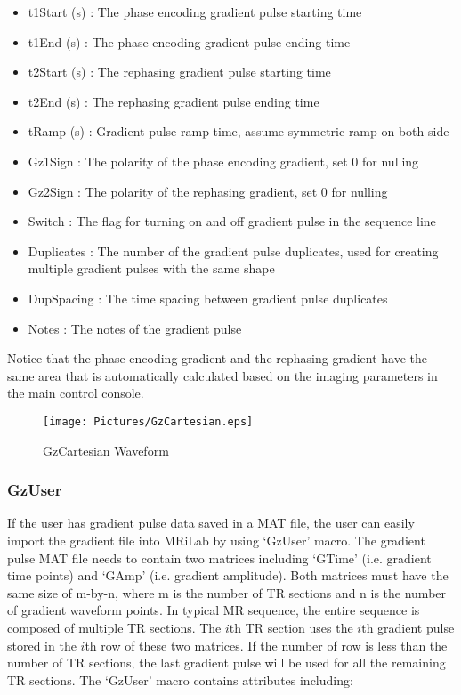 \documentclass{book}%
\begin{document}
\begin{itemize}
	\item t1Start (s) : The phase encoding gradient pulse starting time
	\item t1End (s) : The phase encoding gradient pulse ending time
	\item t2Start (s) : The rephasing gradient pulse starting time
	\item t2End (s) : The rephasing gradient pulse ending time
	\item tRamp (s) : Gradient pulse ramp time, assume symmetric ramp on both side
	\item Gz1Sign : The polarity of the phase encoding gradient, set 0 for nulling
	\item Gz2Sign : The polarity of the rephasing gradient, set 0 for nulling
	\item Switch : The flag for turning on and off gradient pulse in the sequence line
	\item Duplicates : The number of the gradient pulse duplicates, used for creating multiple gradient pulses with the same shape
	\item DupSpacing : The time spacing between gradient pulse duplicates
	\item Notes : The notes of the gradient pulse 
\end{itemize}

Notice that the phase encoding gradient and the rephasing gradient have the same area that is automatically calculated based on the imaging parameters in the main control console.

\begin{figure}[htbp]
	\centering
		\texttt{[image: Pictures/GzCartesian.eps]}
	\caption{GzCartesian Waveform}
	\label{fig:GzCartesian}
\end{figure}

\subsubsection{GzUser}

If the user has gradient pulse data saved in a MAT file, the user can easily import the gradient file into MRiLab by using `GzUser' macro. The gradient pulse MAT file needs to contain two matrices including `GTime' (i.e. gradient time points) and `GAmp' (i.e. gradient amplitude). Both matrices must have the same size of m-by-n, where m is the number of TR sections and n is the number of gradient waveform points. In typical MR sequence, the entire sequence is composed of multiple TR sections. The $i$th TR section uses the $i$th gradient pulse stored in the $i$th row of these two matrices. If the number of row is less than the number of TR sections, the last gradient pulse will be used for all the remaining TR sections. The `GzUser' macro contains attributes including:
\end{document}
